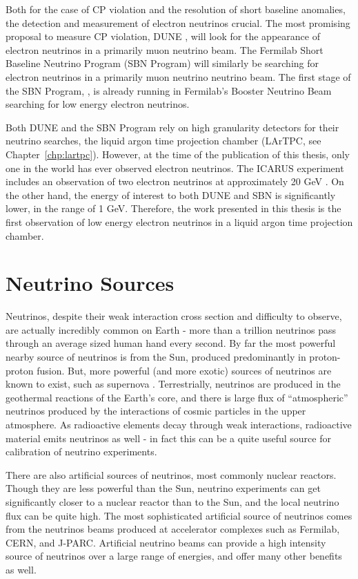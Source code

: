 Both for the case of CP violation and the resolution of short baseline anomalies, the detection and measurement of electron neutrinos crucial.  The most promising proposal to measure CP violation, DUNE \cite{DUNE}, will look for the appearance of electron neutrinos in a primarily muon neutrino beam.  The Fermilab Short Baseline Neutrino Program (SBN Program) \cite{SBN} will similarly be searching for electron neutrinos in a primarily muon neutrino neutrino beam.  The first stage of the SBN Program, \uboone, is already running in Fermilab's Booster Neutrino Beam searching for low energy electron neutrinos.

Both DUNE and the SBN Program rely on high granularity detectors for their neutrino searches, the liquid argon time projection chamber (LArTPC, see Chapter~\ref{chp:lartpc}).  However, at the time of the publication of this thesis, only one \lartpc in the world has ever observed electron neutrinos.  The ICARUS experiment includes an observation of two electron neutrinos at approximately 20 GeV \cite{ICARUS_steriles}.  On the other hand, the energy of interest to both DUNE and SBN is significantly lower, in the range of 1 GeV.  Therefore, the work presented in this thesis is the first observation of low energy electron neutrinos in a liquid argon time projection chamber.   



\section{Neutrino Sources}

Neutrinos, despite their weak interaction cross section and difficulty to observe, are actually incredibly common on Earth - more than a trillion neutrinos pass through an average sized human hand every second.  By far the most powerful nearby source of neutrinos is from the Sun, produced predominantly in proton-proton fusion.  But, more powerful (and more exotic) sources of neutrinos are known to exist, such as supernova \cite{supernova_1987a}.  Terrestrially, neutrinos are produced in the geothermal reactions of the Earth's core, and there is large flux of ``atmospheric'' neutrinos produced by the interactions of cosmic particles in the upper atmosphere.  As radioactive elements decay through weak interactions, radioactive material emits neutrinos as well - in fact this can be a quite useful source for calibration of neutrino experiments.

There are also artificial sources of neutrinos, most commonly nuclear reactors.  Though they are less powerful than the Sun, neutrino experiments can get significantly closer to a nuclear reactor than to the Sun, and the local neutrino flux can be quite high.  The most sophisticated artificial source of neutrinos comes from the neutrinos beams produced at accelerator complexes such as Fermilab, CERN, and J-PARC.  Artificial neutrino beams can provide a high intensity source of neutrinos over a large range of energies, and offer many other benefits as well.  

